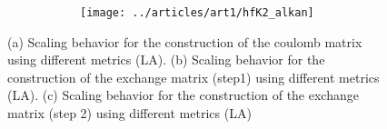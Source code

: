 \begin{figure}[htp]
\begin{subfigure}{\textwidth}
\begin{subfigure}{0.45\textwidth}
\centering
\texttt{[image: ../articles/art1/hfK2\_alkan]}
\end{subfigure}
\hfill
\begin{subtable}{0.45\textwidth}
\centering
{}
\end{subtable}
\caption{}
\label{fig:GS_DFK2SCALE_LA}
\end{subfigure}
\caption[Scaling behavior of the J and K kernels for LA.]{(a) Scaling behavior for the construction of the coulomb matrix using different metrics (LA). (b) Scaling behavior for the construction of the exchange matrix (step1) using different metrics (LA). (c) Scaling behavior for the construction of the exchange matrix (step 2) using different metrics (LA)}
\end{figure}


